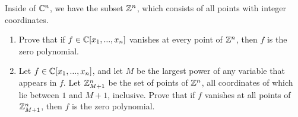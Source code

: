 \begin{exercise}{6}
    Inside of $\mathbb{C}^n$, we have the subset $\mathbb{Z}^n$, which consists of all points with integer coordinates.
    \begin{enumerate}
        \item Prove that if $f\in \mathbb{C}[x_1,...,x_n]$ vanishes at every point of $\mathbb{Z}^n$, then $f$ is the zero polynomial.
        \item Let $f\in \mathbb{C}[x_1,...,x_n]$, and let $M$ be the largest power of any variable that appears in $f$. 
        Let $\mathbb{Z}_{M+1}^n$ be the set of points of $\mathbb{Z}^n$, all coordinates of which lie between $1$ and $M+1$, inclusive. 
        Prove that if $f$ vanishes at all points of $\mathbb{Z}_{M+1}^n$, then $f$ is the zero polynomial.
    \end{enumerate}
\end{exercise}
